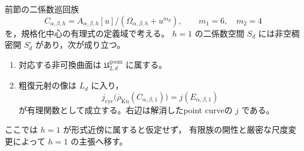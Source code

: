 \begin{proposition}
\label{prop:ku-cyclic-point-j-intrinsic}
前節の二係数巡回族
\[
 C_{\alpha,\beta,h}=A_{\alpha,\beta,h}[u]/(\Omega_{\alpha,\beta,h}+u^{m_d}),
 \qquad m_1=6,\quad m_2=4
\]
を，規格化中心の有理式の定義域で考える。
$h=1$ の二係数空間 $S_d$ には非空稠密開 $S_d^\circ$ があり，次が成り立つ。
\begin{enumerate}
 \item 対応する非可換曲面は $\mathfrak U^{\mathrm{geom}}_{2,d}$ に属する。
 \item 粗復元射の像は $L_d$ に入り，
 \begin{equation}\label{eq:ku-point-j-equals-companion-j}
 j_{\mathrm{cyc}}\bigl(\overline\rho_{\mathrm{Ku}}(C_{\alpha,\beta,1})\bigr)
       =j(E_{\alpha,\beta,1})
 \end{equation}
 が有理関数として成立する。右辺は解消したpoint curveの $j$ である。
\end{enumerate}
ここでは $h=1$ が形式近傍に属すると仮定せず，
有限族の開性と厳密な尺度変更によって $h=1$ の主張へ移す。
\end{proposition}
